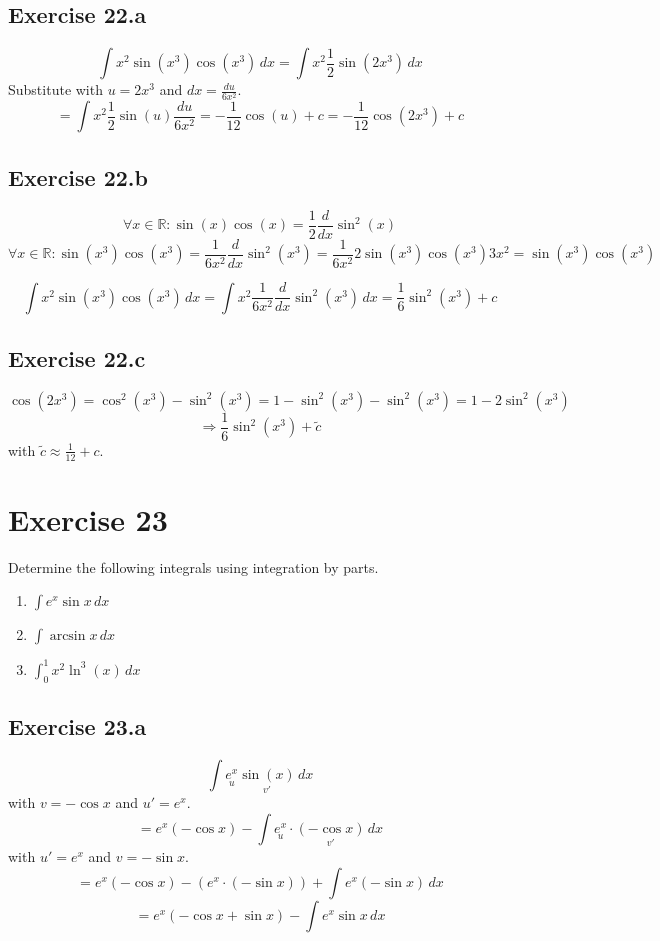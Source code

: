 \documentclass[a4paper]{article}
\theoremstyle{definition}
\begin{document}
\subsection{Exercise 22.a}
%
\[
  \int x^2 \sin(x^3) \cos(x^3) \, dx
  = \int x^2 \frac12 \sin(2x^3) \, dx
\]
Substitute with $u = 2x^3$ and $dx = \frac{du}{6x^2}$.
\[
  = \int x^2 \frac12 \sin(u) \frac{du}{6x^2}
  = - \frac1{12} \cos(u) + c
  = - \frac1{12} \cos(2x^3) + c
\]

\subsection{Exercise 22.b}
%
\[ \forall x \in \mathbb R: \sin(x) \cos(x) = \frac12 \frac{d}{dx} \sin^2(x) \]
\[
  \forall x \in \mathbb R:
    \sin(x^3) \cos(x^3)
      = \frac{1}{6x^2} \frac{d}{dx} \sin^2(x^3)
      = \frac1{6x^2} 2 \sin(x^3) \cos(x^3) 3x^2
      = \sin(x^3) \cos(x^3)
\]

\[
  \int x^2 \sin(x^3) \cos(x^3) \, dx =
  \int x^2 \frac{1}{6x^2} \frac{d}{dx} \sin^2(x^3) \, dx
  = \frac16 \sin^2(x^3) + c
\]

\subsection{Exercise 22.c}

\[
  \cos(2x^3) = \cos^2(x^3) - \sin^2(x^3)
    = 1 - \sin^2(x^3) - \sin^2(x^3)
    = 1 - 2 \sin^2(x^3)
\] \[
  \Rightarrow \frac16 \sin^2(x^3) + \tilde c
\]
with $\tilde c \approx \frac1{12} + c$.

\section{Exercise 23}
\begin{ex}
  Determine the following integrals using integration by parts.
  \begin{enumerate}
    \item $\int e^x \sin{x} \, dx$
    \item $\int \arcsin{x} \, dx$
    \item $\int_0^1 x^2 \ln^3(x) \, dx$
  \end{enumerate}
\end{ex}

\subsection{Exercise 23.a}
\[ \int \underset{u}{e^x} \underset{v'}{\sin(x)} \, dx \]
with $v = -\cos{x}$ and $u' = e^x$.
\[ = e^x (-\cos{x}) - \int \underset{u}{e^x} \cdot \underset{v'}{(-\cos{x})} \, dx \]
with $u' = e^x$ and $v = -\sin{x}$.
\[ = e^x (-\cos{x}) - \left(e^x \cdot (-\sin{x})\right) + \int e^x (-\sin{x}) \, dx \]
\[ = e^x \left(-\cos{x} + \sin{x}\right) - \int e^x \sin{x} \, dx \]
\end{document}
